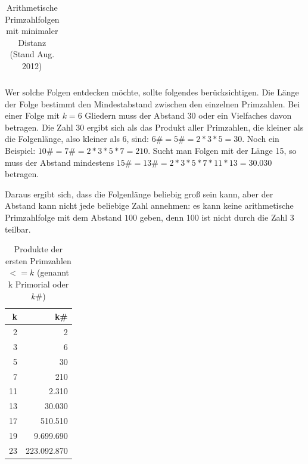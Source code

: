 \begin{refsegment}
\begin{itemize}
\begin{table}[ht]
\begin{center}
\begin{tabular}{|r|r|r|r|r|}
     \hline
     \end{tabular}
     \caption{Arithmetische Primzahlfolgen mit minimaler Distanz (Stand Aug. 2012)}
     \label{Smallest AP-k with minimal difference}
     \end{center}
     \end{table}
     \clearpage

     Wer solche Folgen entdecken möchte, sollte folgendes berücksichtigen.
     Die Länge der Folge bestimmt den Mindestabstand zwischen den einzelnen
     Primzahlen. Bei einer Folge mit $k=6$ Gliedern muss der Abstand 30 oder ein
     Vielfaches davon betragen. Die Zahl 30 ergibt sich als das Produkt aller
     Primzahlen, die kleiner als die Folgenlänge, also kleiner als 6, sind:
     $ 6\# = 5\# = 2 * 3 * 5 = 30 $.
     Noch ein Beispiel: $ 10\# = 7\# = 2 * 3 * 5 * 7 = 210$.
     Sucht man Folgen mit der Länge 15, so muss der
     Abstand mindestens $ 15\# = 13\# = 2 * 3 * 5 * 7 * 11 * 13 = 30.030 $ betragen.
      

     Daraus ergibt sich, dass die Folgenlänge beliebig groß sein kann, aber
     der Abstand kann nicht jede beliebige Zahl annehmen: es kann keine
     arithmetische Primzahlfolge mit dem Abstand $100$ geben, denn 100 ist
     nicht durch die Zahl 3 teilbar.

     \begin{table}[ht]
     \begin{center}
     \hspace*{1cm}\begin{tabular}{|r|r|}
     \hline
      k &                k\# \\ \hline
      2 &                 2 \\
      3 &                 6 \\
      5 &                30 \\
      7 &               210 \\
     11 &             2.310 \\
     13 &            30.030 \\
     17 &           510.510 \\
     19 &         9.699.690 \\
     23 &       223.092.870 \\
      \hline
     \end{tabular}
     \caption{Produkte der ersten Primzahlen $<= k$ (genannt k Primorial oder $k\#$)}
     \end{center}
     \end{table}



\end{itemize}
\end{refsegment}
